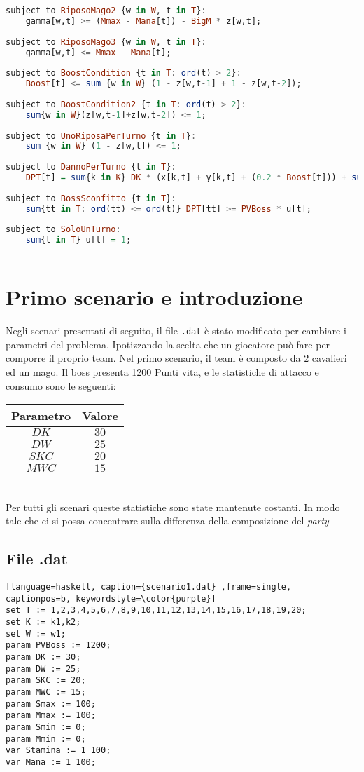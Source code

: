 \documentclass[12pt]{article}
\begin{document}
\begin{lstlisting}[language=haskell, frame=single, caption={Modello in Ampl}, captionpos=b, keywordstyle=\color{purple}]
subject to RiposoMago2 {w in W, t in T}:
    gamma[w,t] >= (Mmax - Mana[t]) - BigM * z[w,t];
    
subject to RiposoMago3 {w in W, t in T}:
    gamma[w,t] <= Mmax - Mana[t];
    
subject to BoostCondition {t in T: ord(t) > 2}:
    Boost[t] <= sum {w in W} (1 - z[w,t-1] + 1 - z[w,t-2]);
        
subject to BoostCondition2 {t in T: ord(t) > 2}:
    sum{w in W}(z[w,t-1]+z[w,t-2]) <= 1;
    
subject to UnoRiposaPerTurno {t in T}:
    sum {w in W} (1 - z[w,t]) <= 1;
    
subject to DannoPerTurno {t in T}:
    DPT[t] = sum{k in K} DK * (x[k,t] + y[k,t] + (0.2 * Boost[t])) + sum{w in W} z[w,t] * DW;
    
subject to BossSconfitto {t in T}:
    sum{tt in T: ord(tt) <= ord(t)} DPT[tt] >= PVBoss * u[t];
    
subject to SoloUnTurno:
    sum{t in T} u[t] = 1; 
    
\end{lstlisting}

\section{Primo scenario e introduzione}
Negli scenari presentati di seguito, il file \texttt{.dat} è stato modificato per cambiare i parametri del problema. Ipotizzando la scelta che un giocatore può fare per comporre il proprio team.
Nel primo scenario, il team è composto da 2 cavalieri ed un mago. Il boss presenta 1200 Punti vita, e le statistiche di attacco e consumo sono le seguenti:
\begin{table}[h!]
    \centering
    \begin{tabular}{|c|c|}
        \hline
        \textbf{Parametro} & \textbf{Valore} \\
        \hline
        $DK$ & $30$ \\
        $DW$ & $25$ \\
        $SKC$ & $20$ \\
        $MWC$ & $15$ \\
        \hline
    \end{tabular}
\end{table}\\
Per tutti gli scenari queste statistiche sono state mantenute costanti. In modo tale che ci si possa concentrare sulla differenza della composizione del \textit{party}
\subsection{File .dat}
\begin{lstlisting}[language=haskell, caption={scenario1.dat} ,frame=single, captionpos=b, keywordstyle=\color{purple}]  
set T := 1,2,3,4,5,6,7,8,9,10,11,12,13,14,15,16,17,18,19,20;
set K := k1,k2;
set W := w1;    
param PVBoss := 1200;
param DK := 30;
param DW := 25;
param SKC := 20;
param MWC := 15;
param Smax := 100;
param Mmax := 100;
param Smin := 0;
param Mmin := 0;
var Stamina := 1 100;
var Mana := 1 100;
\end{lstlisting}
\end{document}

